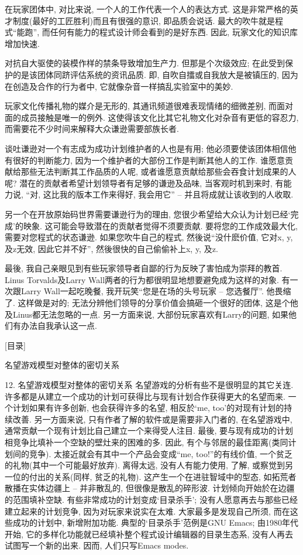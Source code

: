 \documentclass[a4paper,12pt,UTF8,twoside]{ctexbook}
\begin{document}
在玩家团体中, 对比来说, 一个人的工作代表一个人的表达方式. 这是非常严格的英才制度(最好的工匠胜利)而且有很强的意识, 即品质会说话. 最大的吹牛就是程式``能跑'', 而任何有能力的程式设计师会看到的是好东西. 因此, 玩家文化的知识库增加快速.

对抗自大驱使的装模作样的禁条导致增加生产力. 但那是个次级效应; 在此受到保护的是该团体同跻评估系统的资讯品质. 即, 自吹自擂或自我放大是被镇压的, 因为在创造及合作的行为者中, 它就像杂音一样搞乱实验室中的美妙.

玩家文化传播礼物的媒介是无形的, 其通讯频道很难表现情绪的细微差别, 而面对面的成员接触是唯一的例外. 这使得该文化比其它礼物文化对杂音有更低的容忍力, 而需要花不少时间来解释大众谦逊需要部族长者.

谈吐谦逊对一个有志成为成功计划维护者的人也是有用; 他必须要使该团体相信他有很好的判断能力, 因为一个维护者的大部份工作是判断其他人的工作. 谁愿意贡献给那些无法判断其工作品质的人呢, 或者谁愿意贡献给那些会吞食计划成果的人呢? 潜在的贡献者希望计划领导者有足够的谦逊及品味, 当客观时机到来时, 有能力说, ``对, 这比我的版本工作来得好, 我会用它'' -- 并且将成就让该收到的人收取.

另一个在开放原始码世界需要谦逊行为的理由, 您很少希望给大众认为计划已经`完成'的映象. 这可能会导致潜在的贡献者觉得不须要贡献. 要将您的工作成效最大化, 需要对您程式的状态谦逊. 如果您吹牛自己的程式, 然後说``没什麽价值, 它对x, y, 及z无效, 因此它并不好'', 然後很快的自己偷偷补上x, y, 及z.

最後, 我自己亲眼见到有些玩家领导者自鄙的行为反映了害怕成为崇拜的教首. Linus Torvalds及Larry Wall两者的行为都很明显地想要避免成为这样的对象. 有一次跟Larry Wall一起吃晚餐, 我开玩笑``您是在场的头号玩家 -- 您选餐厅''. 他畏缩了. 这样做是对的; 无法分辨他们领导的分享价值会搞砸一个很好的团体, 这是个他及Linus都无法忽略的一点. 另一方面来说, 大部份玩家喜欢有Larry的问题, 如果他们有办法自我承认这一点.


[目录]

名望游戏模型对整体的密切关系

12. 名望游戏模型对整体的密切关系
名望游戏的分析有些不是很明显的其它关连. 许多都是从建立一个成功的计划可获得比与现有计划合作获得更大的名望而来. 一个计划如果有许多创新, 也会获得许多的名望, 相反於`me, too'的对现有计划的持续改善. 另一方面来说, 只有作者了解的软件或是需要非入门者的, 在名望游戏中, 通常贡献一个现有计划比自己建立一个来得受人注目. 最後, 要与现有成功的计划相竞争比填补一个空缺的壁灶来的困难的多.
因此, 有个与邻居的最佳距离(类同计划间的竞争). 太接近就会有其中一个产品会变成``me, too!''的有线价值, 一个贫乏的礼物(其中一个可能最好放弃). 离得太远, 没有人有能力使用, 了解, 或察觉到另一位的付出的关系(同样, 贫乏的礼物). 这产生一个在进驻智域中的型态, 如拓荒者散播在实体边疆上 -- 并非散乱的, 但很像是散乱的碎形波. 计划倾向开始於在边疆的范围填补空缺.
有些非常成功的计划变成`目录杀手'; 没有人愿意再去与那些已经建立起来的计划竞争, 因为对玩家来说实在太难. 大家最多是发现自己所须, 而在这些成功的计划中, 新增附加功能. 典型的`目录杀手'范例是GNU Emacs; 由1980年代开始, 它的多样化功能就已经填补整个程式设计编辑器的目录生态系, 没有人再去试图写一个新的出来. 因而, 人们只写Emacs modes.
\end{document}
